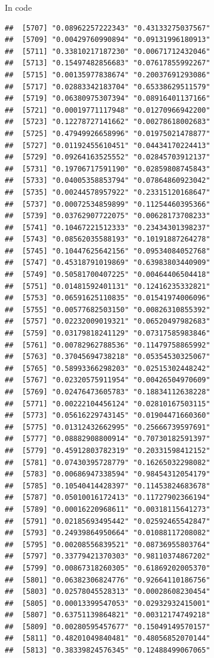 \documentclass[ignorenonframetext,]{beamer}
\begin{document}
\begin{frame}[fragile]{In code}
\begin{verbatim}
##  [5707] "0.08962257222343" "0.43133275037567"
##  [5709] "0.00429760990894" "0.09131996180913"
##  [5711] "0.33810217187230" "0.00671712432046"
##  [5713] "0.15497482856683" "0.07617855992267"
##  [5715] "0.00135977838674" "0.20037691293086"
##  [5717] "0.02883342183704" "0.65338629511579"
##  [5719] "0.06380975307394" "0.08916401137166"
##  [5721] "0.00019771117948" "0.01270966942200"
##  [5723] "0.12278727141662" "0.00278618002683"
##  [5725] "0.47949926658996" "0.01975021478877"
##  [5727] "0.01192455610451" "0.04434170224413"
##  [5729] "0.09264163525552" "0.02845703912137"
##  [5731] "0.19706717591190" "0.02859808745843"
##  [5733] "0.04005358853794" "0.07864860923042"
##  [5735] "0.00244578957922" "0.23315120168647"
##  [5737] "0.00072534859899" "0.11254460395366"
##  [5739] "0.03762907722075" "0.00628173708233"
##  [5741] "0.10467221512333" "0.23434301398237"
##  [5743] "0.08562035588193" "0.10191887264278"
##  [5745] "0.10447625642156" "0.09534084052768"
##  [5747] "0.45318791019869" "0.63983803440909"
##  [5749] "0.50581700407225" "0.00464406504418"
##  [5751] "0.01481592401131" "0.12416235332821"
##  [5753] "0.06591625110835" "0.01541974006096"
##  [5755] "0.00577682503150" "0.00826310855392"
##  [5757] "0.02232009019321" "0.06520497982683"
##  [5759] "0.03179818241129" "0.07317585983846"
##  [5761] "0.00782962788536" "0.11479758865992"
##  [5763] "0.37045694738218" "0.05354530325067"
##  [5765] "0.58993366298203" "0.02515302448242"
##  [5767] "0.02320575911954" "0.00426504970609"
##  [5769] "0.02476473605783" "0.18834112638228"
##  [5771] "0.00222104456124" "0.02810167503115"
##  [5773] "0.05616229743145" "0.01904471660360"
##  [5775] "0.01312432662995" "0.25666739597691"
##  [5777] "0.08882908800914" "0.70730182591397"
##  [5779] "0.45912803782319" "0.20331598412152"
##  [5781] "0.07430395728779" "0.16265032298082"
##  [5783] "0.00686947338594" "0.98454312054179"
##  [5785] "0.10540414428397" "0.11453824683678"
##  [5787] "0.05010016172413" "0.11727902366194"
##  [5789] "0.00016220968611" "0.00318115641273"
##  [5791] "0.02185693495442" "0.02592465542847"
##  [5793] "0.24939864950664" "0.01088117208082"
##  [5795] "0.00208556839521" "0.08736955803764"
##  [5797] "0.33779421370303" "0.98110374867202"
##  [5799] "0.00867318260305" "0.61869202005370"
##  [5801] "0.06382306824776" "0.92664110186756"
##  [5803] "0.02578045528313" "0.00028608230454"
##  [5805] "0.00013399547053" "0.02932932415001"
##  [5807] "0.63751139864821" "0.00312174749218"
##  [5809] "0.00280595457677" "0.15049149570157"
##  [5811] "0.48201049840481" "0.48056852070144"
##  [5813] "0.38339824576345" "0.12488499067065"

\end{verbatim}
\end{frame}
\end{document}
